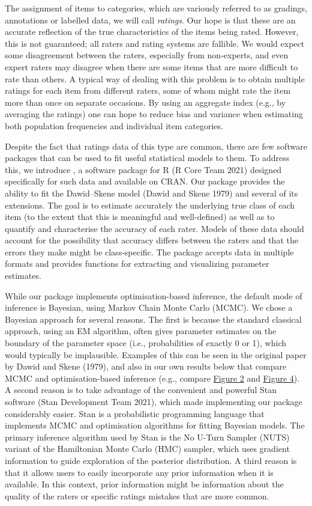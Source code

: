The assignment of items to categories, which are variously referred to as gradings,
annotations or labelled data, we will call \emph{ratings}. Our hope is that
these are an accurate reflection of the true characteristics of the items being
rated. However, this is not guaranteed; all raters and rating systems are fallible.
We would expect some disagreement between the raters, especially from non-experts,
and even expert raters may disagree when there are some items that are more difficult
to rate than others. A typical way of dealing with this problem is to obtain multiple
ratings for each item from different raters, some of whom might rate the item
more than once on separate occasions. By using an aggregate index (e.g., by averaging
the ratings) one can hope to reduce bias and variance when estimating both
population frequencies and individual item categories.

Despite the fact that ratings data of this type are common, there are few software
packages that can be used to fit useful statistical models to them.
To address this, we introduce , a software package for R (R Core Team 2021)
designed specifically for such data and available on CRAN. Our package provides the
ability to fit the Dawid--Skene model (Dawid and Skene 1979) and several of its extensions.
The goal is to estimate accurately the underlying true class of each item (to the
extent that this is meaningful and well-defined) as well as to quantify and
characterise the accuracy of each rater. Models of these data should account
for the possibility that accuracy differs between the raters and that the errors
they make might be class-specific. The package accepts data in multiple formats
and provides functions for extracting and visualizing parameter estimates.

While our package implements optimisation-based inference, the default mode of
inference is Bayesian, using Markov Chain Monte Carlo (MCMC). We chose a Bayesian
approach for several reasons. The first is because the standard classical approach,
using an EM algorithm, often gives parameter estimates on the boundary of the
parameter space (i.e., probabilities of exactly 0 or 1), which would typically
be implausible. Examples of this can be seen in the original paper by Dawid and Skene (1979),
and also in our own results below that compare MCMC and optimisation-based
inference (e.g., compare \protect\hyperlink{fig:plot-theta}{Figure 2} and
\protect\hyperlink{fig:plot-theta-fit2}{Figure 4}). A second reason is to take advantage of the
convenient and powerful Stan software (Stan Development Team 2021), which made implementing our
package considerably easier. Stan is a probabilistic programming language that
implements MCMC and optimisation algorithms for fitting Bayesian models. The
primary inference algorithm used by Stan is the No U-Turn Sampler (NUTS) variant
of the Hamiltonian Monte Carlo (HMC) sampler, which uses gradient information
to guide exploration of the posterior distribution. A third reason is that it allows
users to easily incorporate any prior information when it is available. In this
context, prior information might be information about the quality of the raters
or specific ratings mistakes that are more common.

